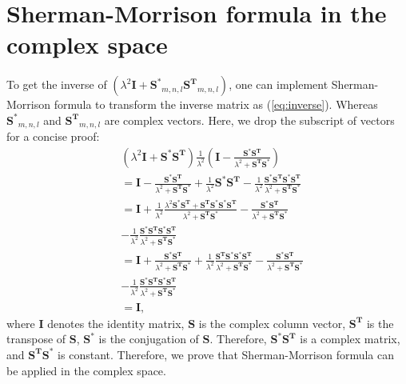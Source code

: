 \section{Sherman-Morrison formula in the complex space}
\label{S-M-F}
To get the inverse of $ ( \lambda^{2} \mathbf{I} +
\mathbf{S^{*}}_{m,n,l} \mathbf{S^{T}}_{m,n,l}) $, one can implement
Sherman-Morrison formula to transform the inverse matrix as
(\ref{eq:inverse}).  Whereas $ \mathbf{S^{*}}_{m,n,l} $ and $
\mathbf{S^{T}}_{m,n,l} $ are complex vectors.  Here, we drop the
subscript of vectors for a concise proof:
\begin{displaymath}
    \label{eq:prove of inverse}
    \begin{aligned}
         & (\lambda^{2} \mathbf{I} + \mathbf{S^{*}S^{T}}) \frac{ 1 } { \lambda^{2} }
        ( \mathbf{I} - \frac{ \mathbf{S^{*}S^{T}}}
        { \lambda^{2} + \mathbf{S^{T}S^{*}} })                                       \\
         & = \mathbf{ I } - \frac{ \mathbf{S^{*}S^{T}} }
        { \lambda^{2} + \mathbf{S^{T}S^{*}} } + \frac{ 1 } { \lambda^{2} }
        \mathbf{S^{*}S^{T}} - \frac{ 1 } { \lambda^{2} }
        \frac{ \mathbf{S^{*}S^{T}S^{*}S^{T}} } { \lambda^{2} + \mathbf{S^{T}S^{*}} } \\
         & = \mathbf{ I } + \frac{ 1 } { \lambda^{2} }
        \frac{ \lambda^{2} \mathbf{S^{*}S^{T}} + \mathbf{ S^{T}S^{*}}
        \mathbf{S^{*}S^{T} } } { \lambda^{2} + \mathbf{S^{T}S^{*}} }
        - \frac{ \mathbf{S^{*}S^{T}}} { \lambda^{2} + \mathbf{S^{T}S^{*}} }          \\
         & - \frac{ 1 } { \lambda^{2} } \frac{ \mathbf{S^{*}S^{T}}
        \mathbf{S^{*}S^{T}} } { \lambda^{2} + \mathbf{S^{T}S^{*}} }                  \\
         & = \mathbf{ I } + \frac{ \mathbf{S^{*}S^{T}}}
        { \lambda^{2} + \mathbf{S^{T}S^{*}} } + \frac{ 1 } { \lambda^{2} }
        \frac{ \mathbf{S^{T}S^{*}} \mathbf{S^{*}S^{T} } }
        { \lambda^{2} + \mathbf{S^{T}S^{*}} } - \frac{ \mathbf{S^{*}S^{T}}}
        { \lambda^{2} + \mathbf{S^{T}S^{*}} }                                        \\
         & - \frac{ 1 } { \lambda^{2} } \frac{ \mathbf{ S^{*}S^{T} }
        \mathbf{ S^{*}S^{T} } } { \lambda^{2} + \mathbf{ S^{T}S^{*} }}               \\
         & = \mathbf{ I },
    \end{aligned}
\end{displaymath}
where $\mathbf{I}$ denotes the identity matrix, $\mathbf{S}$ is the
complex column vector, $\mathbf{S^{T}}$ is the transpose of
$\mathbf{S}$, $\mathbf{S^{*}}$ is the conjugation of $\mathbf{S}$.
Therefore, $ \mathbf{S^{*}S^{T}} $ is a complex matrix, and $
\mathbf{S^{T}S^{*}} $ is constant. Therefore, we prove that
Sherman-Morrison formula can be applied in the complex space.




